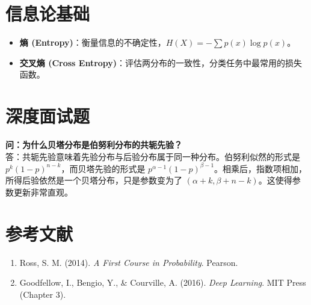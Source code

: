 \documentclass[12pt, a4paper]{article}
\begin{document}
\section{信息论基础}
\begin{itemize}
    \item \textbf{熵 (Entropy)}：衡量信息的不确定性，$H(X) = - \sum p(x) \log p(x)$。
    \item \textbf{交叉熵 (Cross Entropy)}：评估两分布的一致性，分类任务中最常用的损失函数。
\end{itemize}

\section{深度面试题}

\textbf{问：为什么贝塔分布是伯努利分布的共轭先验？}\\
答：共轭先验意味着先验分布与后验分布属于同一种分布。伯努利似然的形式是 $p^k(1-p)^{n-k}$，而贝塔先验的形式是 $p^{\alpha-1}(1-p)^{\beta-1}$。相乘后，指数项相加，所得后验依然是一个贝塔分布，只是参数变为了 $(\alpha+k, \beta+n-k)$。这使得参数更新非常直观。

\section{参考文献}
\begin{enumerate}
    \item Ross, S. M. (2014). \textit{A First Course in Probability}. Pearson.
    \item Goodfellow, I., Bengio, Y., \& Courville, A. (2016). \textit{Deep Learning}. MIT Press (Chapter 3).
\end{enumerate}
\end{document}
